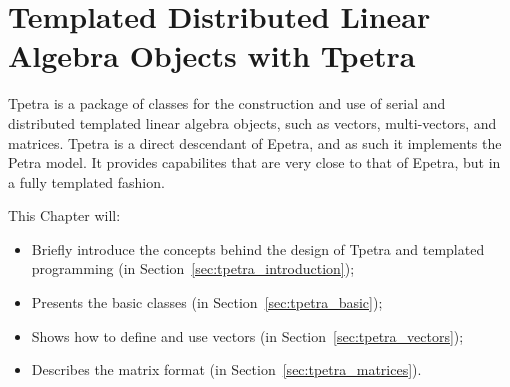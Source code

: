 % 
% 
% 
%  
%  
% 

\section{Templated Distributed Linear Algebra Objects with Tpetra}
\label{chap:tpetra}

Tpetra is a package of classes for the construction and use of serial and
distributed templated linear algebra objects, such as vectors, multi-vectors,
and matrices. 
Tpetra is a direct
descendant of Epetra, and as such it implements the Petra model.  
It provides capabilites that are very close to that of Epetra, but in a fully
templated fashion.

This Chapter will:
\begin{itemize}
\itemsep=1pt
\item Briefly introduce the concepts behind the design of Tpetra and
templated programming (in Section~\ref{sec:tpetra_introduction});
\item Presents the basic classes (in Section~\ref{sec:tpetra_basic});
\item Shows how to define and use vectors (in Section~\ref{sec:tpetra_vectors});
\item Describes the matrix format (in Section~\ref{sec:tpetra_matrices}).
\end{itemize}


